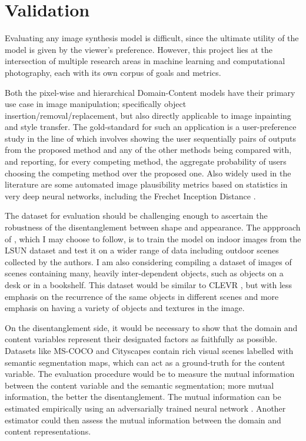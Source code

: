 \documentclass[withindex,glossary,firstyr,times]{cam-thesis}
\begin{document}

\section{Validation}

Evaluating any image synthesis model is difficult, since the ultimate utility of the model is given by the viewer's preference. However, this project lies at the intersection of multiple research areas in machine learning and computational photography, each with its own corpus of goals and metrics.

Both the pixel-wise and hierarchical Domain-Content models have their primary use case in image manipulation; specifically object insertion/removal/replacement, but also directly applicable to image inpainting and style transfer. The gold-standard for such an application is a user-preference study in the line of \cite{hong2018learning, bau2019semantic, park2019semantic, liu2020decompose} which involves showing the user sequentially pairs of outputs from the proposed method and any of the other methods being compared with, and reporting, for every competing method, the aggregate probability of users choosing the competing method over the proposed one. Also widely used in the literature are some automated image plausibility metrics based on statistics in very deep neural networks, including the Frechet Inception Distance \cite{heusel2017gans}.

The dataset for evaluation should be challenging enough to ascertain the robustness of the disentanglement between shape and appearance. The appproach of \cite{bau2019semantic}, which I may choose to follow, is to train the model on indoor images from the LSUN dataset \cite{yu2015lsun} and test it on a wider range of data including outdoor scenes collected by the authors. I am also considering compiling a dataset of images of scenes containing many, heavily inter-dependent objects, such as objects on a desk or in a bookshelf. This dataset would be similar to CLEVR \cite{johnson2017clevr}, but with less emphasis on the recurrence of the same objects in different scenes and more emphasis on having a variety of objects and textures in the image.

On the disentanglement side, it would be necessary to show that the domain and content variables represent their designated factors as faithfully as possible. Datasets like MS-COCO \cite{lin2014microsoft} and Cityscapes \cite{cordts2016cityscapes} contain rich visual scenes labelled with semantic segmentation maps, which can act as a ground-truth for the content variable. The evaluation procedure would be to measure the mutual information between the content variable and the semantic segmentation; more mutual information, the better the disentanglement. The mutual information can be estimated empirically using an adversarially trained neural network \cite{belghazi2018mutual}. Another estimator could then assess the mutual information between the domain and content representations. 
\end{document}
